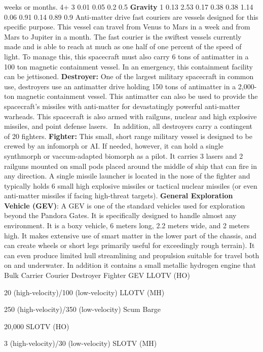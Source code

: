 weeks or months.
4+
3
0.01
0.05
0.2
0.5
\textbf{Gravity}
1
0.13
2.53
0.17
0.38
0.38
1.14
0.06
0.91
0.14
0.89
0.9
Anti-matter drive fast couriers are vessels designed
for this specific purpose. This vessel can
travel from Venus to Mars in a week and from 
Mars to Jupiter in a month. The fast courier is the 
swiftest vessels currently made and is able to reach 
at much as one half of one percent of the speed 
of light. To manage this, this spacecraft must also 
carry 6 tons of antimatter in a 100 ton magnetic 
containment vessel. In an emergency, this containment
facility can be jettisoned.
\textbf{Destroyer:} One of the largest military spacecraft 
in common use, destroyers use an antimatter drive 
holding 150 tons of antimatter in a 2,000-ton magnetic
containment vessel. This antimatter can also
be used to provide the spacecraft's missiles with 
anti-matter for devastatingly powerful anti-matter 
warheads. This spacecraft is also armed with 
railguns, nuclear and high explosive missiles, and 
point defense lasers.  In addition, all destroyers 
carry a contingent of 20 fighters.
\textbf{Fighter: }This small, short range military vessel is designed
to be crewed by an infomorph or AI. If needed,
however, it can hold a single synthmorph or vaccum-adapted
biomorph as a pilot. It carries 3 lasers and 2
railguns mounted on small pods placed around the 
middle of ship that can fire in any direction. A single 
missile launcher is located in the nose of the fighter 
and typically holds 6 small high explosive missiles or 
tactical nuclear missiles (or even anti-matter missiles 
if facing high-threat targets).
\textbf{General Exploration Vehicle (GEV)}: A GEV is one 
of the standard vehicles used for exploration beyond 
the Pandora Gates. It is specifically designed to handle 
almost any environment. It is a boxy vehicle, 6 meters 
long, 2.2 meters wide, and 2 meters high. It makes 
extensive use of smart matter in the lower part of the 
chassis, and can create wheels or short legs primarily
useful for exceedingly rough terrain). It can even
produce limited hull streamlining and propulsion 
suitable for travel both on and underwater. In addition
it contains a small metallic hydrogen engine that
Bulk Carrier
Courier
Destroyer
Fighter
GEV
LLOTV (HO)

20 (high-velocity)/100 (low-velocity)
LLOTV (MH)

250 (high-velocity)/350 (low-velocity) 
Scum Barge

20,000
SLOTV (HO)

3 (high-velocity)/30 (low-velocity) 
SLOTV (MH)

